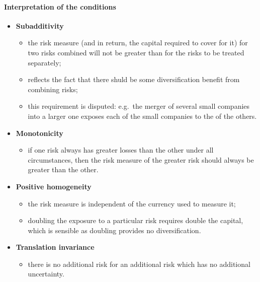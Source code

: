 \documentclass[notoc,notitlepage]{tufte-book}
\begin{document}
\paragraph{Interpretation of the conditions}

\begin{itemize}
  \item \textbf{Subadditivity}
    \begin{itemize}
      \item the risk measure (and in return, the capital required to cover for it) for two risks combined will not be greater than for the risks to be treated separately;
      \item reflects the fact that there shuld be some diversification benefit from combining risks;
      \item this requirement is disputed: e.g.\ the merger of several small companies into a larger one exposes each of the small companies to the  of the others.
    \end{itemize}

  \item \textbf{Monotonicity}
    \begin{itemize}
      \item if one risk always has greater losses than the other under all circumstances, then the risk measure of the greater risk should always be greater than the other.
    \end{itemize}

  \item \textbf{Positive homogeneity}
    \begin{itemize}
      \item the risk measure is independent of the currency used to measure it;
      \item doubling the exposure to a particular risk requires double the capital, which is sensible as doubling provides no diversification.
    \end{itemize}

  \item \textbf{Translation invariance}
    \begin{itemize}
      \item there is no additional risk for an additional risk which has no additional uncertainty.
    \end{itemize}
\end{itemize}



\backmatter\

\pagestyle{plain}

\nobibliography*




\printindex
\end{document}
